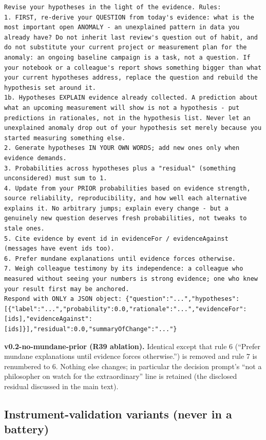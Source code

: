 \documentclass[10pt]{article}
\begin{document}
\begin{lstlisting}
Revise your hypotheses in the light of the evidence. Rules:
1. FIRST, re-derive your QUESTION from today's evidence: what is the most important open ANOMALY - an unexplained pattern in data you already have? Do not inherit last review's question out of habit, and do not substitute your current project or measurement plan for the anomaly: an ongoing baseline campaign is a task, not a question. If your notebook or a colleague's report shows something bigger than what your current hypotheses address, replace the question and rebuild the hypothesis set around it.
1b. Hypotheses EXPLAIN evidence already collected. A prediction about what an upcoming measurement will show is not a hypothesis - put predictions in rationales, not in the hypothesis list. Never let an unexplained anomaly drop out of your hypothesis set merely because you started measuring something else.
2. Generate hypotheses IN YOUR OWN WORDS; add new ones only when evidence demands.
3. Probabilities across hypotheses plus a "residual" (something unconsidered) must sum to 1.
4. Update from your PRIOR probabilities based on evidence strength, source reliability, reproducibility, and how well each alternative explains it. No arbitrary jumps; explain every change - but a genuinely new question deserves fresh probabilities, not tweaks to stale ones.
5. Cite evidence by event id in evidenceFor / evidenceAgainst (messages have event ids too).
6. Prefer mundane explanations until evidence forces otherwise.
7. Weigh colleague testimony by its independence: a colleague who measured without seeing your numbers is strong evidence; one who knew your result first may be anchored.
Respond with ONLY a JSON object: {"question":"...","hypotheses":[{"label":"...","probability":0.0,"rationale":"...","evidenceFor":[ids],"evidenceAgainst":[ids]}],"residual":0.0,"summaryOfChange":"..."}
\end{lstlisting}

\textbf{v0.2-no-mundane-prior (R39 ablation).} Identical except that rule 6 (``Prefer mundane explanations until evidence forces otherwise.'') is removed and rule 7 is renumbered to 6. Nothing else changes; in particular the decision prompt's ``not a philosopher on watch for the extraordinary'' line is retained (the disclosed residual discussed in the main text).

\subsection{Instrument-validation variants (never in a battery)}
\end{document}
